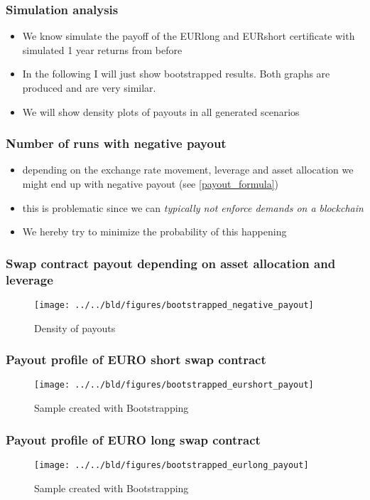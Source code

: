 \documentclass[11pt]{beamer}
\begin{document}
\begin{frame}[t]
    \frametitle{Simulation analysis}
    \begin{itemize}
        \item We know simulate the payoff of the EURlong and EURshort certificate with simulated 1 year returns from before
        \item In the following I will just show bootstrapped results. Both graphs are produced and are very similar.
        \item We will show density plots of payouts in all generated scenarios
    \end{itemize}

    \note{~}
\end{frame}

\begin{frame}[t]
    \frametitle{Number of runs with negative payout}
    \begin{itemize}
        \item depending on the exchange rate movement, leverage and asset allocation we might end up with negative payout (see \ref{payout_formula})
        \item this is problematic since we can \it{typically} not enforce demands on a blockchain
        \item We hereby try to minimize the probability of this happening
    \end{itemize}

    \note{~}
\end{frame}


\begin{frame}[t]
    \frametitle{Swap contract payout depending on asset allocation and leverage}
    \begin{figure}
        \caption{Density of payouts}
        \texttt{[image: ../../bld/figures/bootstrapped\_negative\_payout]}
    \end{figure}

\end{frame}


\begin{frame}[t]
    \frametitle{Payout profile of EURO short swap contract}
    \begin{figure}
        \caption{Sample created with Bootstrapping}
        \texttt{[image: ../../bld/figures/bootstrapped\_eurshort\_payout]}
    \end{figure}
\end{frame}


\begin{frame}[t]
    \frametitle{Payout profile of EURO long swap contract}
    \begin{figure}
        \caption{Sample created with Bootstrapping}
        \texttt{[image: ../../bld/figures/bootstrapped\_eurlong\_payout]}
    \end{figure}

\end{frame}
\end{document}
